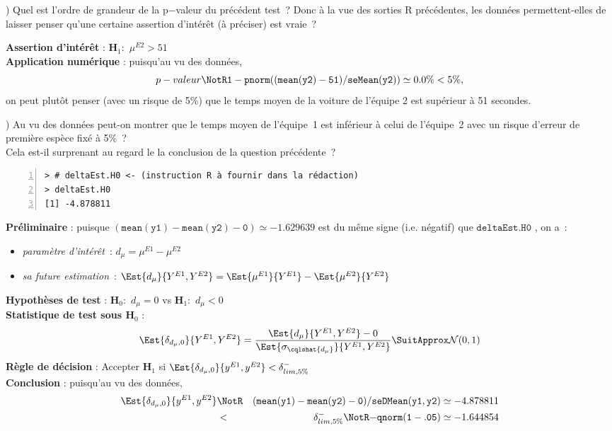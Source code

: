 \documentclass[10pt]{report}
\begin{document}
\begin{exercice}
) Quel est l'ordre de grandeur de la p$-$valeur du précédent test~? Donc à la vue des sorties R précédentes, les données permettent-elles de laisser penser qu'une certaine assertion d'intérêt (à préciser) est vraie~?



\begin{Correction}

\noindent \textbf{Assertion d'intérêt} :  $\mathbf{H}_1:$ $\mu^{E2}>51$ \\
\textbf{Application numérique} :  puisqu'au vu des données, 
  \[
p-valeur\NotR\mathtt{1-pnorm((mean(y2)-51)/seMean(y2))} \simeq 0.0\% < 5\%,
\]
on peut plutôt penser (avec un risque de 5\%) que le temps moyen de la voiture de l'équipe 2 est supérieur à 51 secondes.
\end{Correction}


) Au vu des données peut-on montrer que le temps moyen de l'équipe~1 est inférieur à celui de l'équipe~2  avec un risque d'erreur de première espèce fixé à 5\%~?\\
Cela est-il surprenant au regard le la conclusion de la question précédente~?\\
\IndicR
\begin{Verbatim}[frame=leftline,fontfamily=tt,fontshape=n,numbers=left]
> # deltaEst.H0 <- (instruction R à fournir dans la rédaction)
> deltaEst.H0
[1] -4.878811
\end{Verbatim}



\begin{Correction}
\noindent \textbf{Préliminaire} : puisque $\mathtt{(mean(y1)-mean(y2)-0)}\simeq-1.629639$ est du même signe (i.e. négatif) que $\mathtt{deltaEst.H0}$ , on a~: 
      \begin{itemize}
\item \textit{paramètre d'intérêt}~: $d_\mu=\mu^{E1}-\mu^{E2}$
\item \textit{sa future estimation}~: $\Est{d_\mu}{Y^{E1},Y^{E2}}=\Est{\mu^{E1}}{Y^{E1}}-\Est{\mu^{E2}}{Y^{E2}}$
\end{itemize}
\noindent \textbf{Hypothèses de test} : $\mathbf{H}_0:$ $d_\mu=0$ vs {\large $\mathbf{H}_1:$ $d_\mu<0$}\\
\textbf{Statistique de test sous $\mathbf{H}_0$} :
  $$
  \Est{\delta_{d_\mu,0}}{Y^{E1},Y^{E2}}= {\displaystyle \frac{\Est{d_\mu}{Y^{E1},Y^{E2}}-0}{
\Est{\sigma_{\cqlshat{d_\mu}}}{Y^{E1},Y^{E2}}
}} 
  \SuitApprox \mathcal{N}(0,1)
  $$
\textbf{Règle de décision} : Accepter $\mathbf{H}_1$ si 
  $\Est{\delta_{d_\mu,0}}{y^{E1},y^{E2}} < \delta^-_{lim,5\%}$\\
\noindent \textbf{Conclusion} :
puisqu'au vu des données, 
  \begin{eqnarray*}
\Est{\delta_{d_\mu,0}}{y^{E1},y^{E2}} &\NotR&\mathtt{(mean(y1)-mean(y2)-0)/seDMean(y1,y2)}\simeq -4.878811\\& <  & \delta^-_{lim,5\%} \NotR \mathtt{-qnorm(1-.05)}\simeq-1.644854
\end{eqnarray*}
  

\end{Correction}
\end{exercice}
\end{document}
